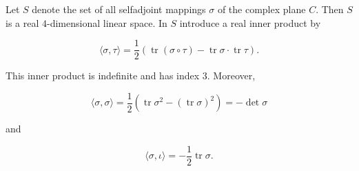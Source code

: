Let $S$ denote the set of all selfadjoint mappings $\sigma$ of the complex plane $C$. Then $S$ is a real $4$-dimensional linear space. In $S$ introduce a real inner product by

$$\langle \sigma, \tau \rangle = \frac{1}{2} \left( \operatorname{tr} (\sigma \circ \tau) - \operatorname{tr} \sigma \cdot \operatorname{tr} \tau \right). \tag{11.69}$$

This inner product is indefinite and has index $3$. Moreover,

$$\langle \sigma, \sigma \rangle = \frac{1}{2} \left( \operatorname{tr} \sigma^2 - (\operatorname{tr} \sigma)^2 \right) = -\det \sigma \tag{11.70}$$

and

$$\langle \sigma, \iota \rangle = -\frac{1}{2} \operatorname{tr} \sigma. \tag{11.71}$$
